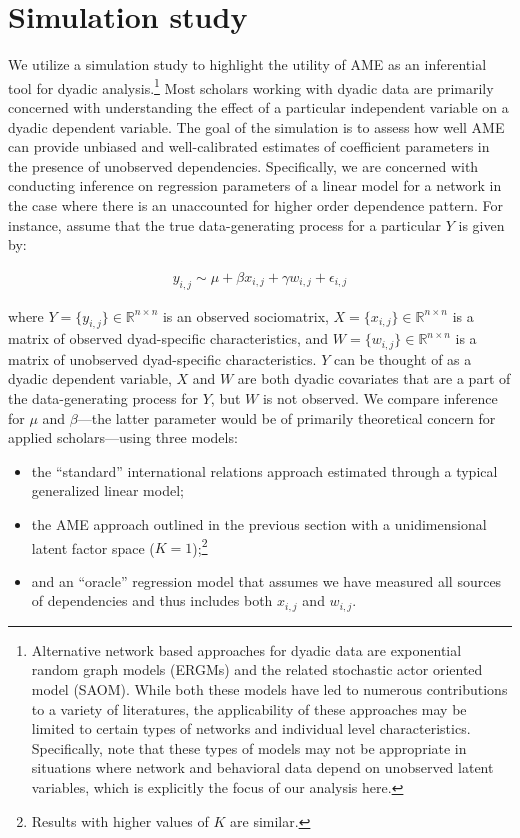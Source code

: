 \section{\textbf{Simulation study}}

We utilize a simulation study to highlight the utility of AME as an inferential tool for dyadic analysis.\footnote{Alternative network based approaches for dyadic data are exponential random graph models (ERGMs) and the related stochastic actor oriented model (SAOM). While both these models have led to numerous contributions to a variety of literatures, the applicability of these approaches may be limited to certain types of networks and individual level characteristics. Specifically, \citet{block:etal:2017} note that these types of  models may not be appropriate in situations where network and behavioral data depend on unobserved latent variables, which is explicitly the focus of our analysis here.} Most scholars working with dyadic data are primarily concerned with understanding the effect of a particular independent variable on a dyadic dependent variable. The goal of the simulation is to assess how well AME can provide unbiased and well-calibrated estimates of coefficient parameters in the presence of unobserved dependencies. Specifically, we are concerned with conducting inference on regression parameters of a linear model for a network in the case where there is an unaccounted for higher order dependence pattern. For instance, assume that the true data-generating process for a particular $Y$ is given by:

\begin{align}
	y_{i,j} \sim  \mu + \beta x_{i,j} + \gamma w_{i,j} + \epsilon_{i,j}
	\label{eqn:sim}
\end{align}

where $Y= \{y_{i,j}\}\in \mathbb R^{n\times n}$ is an observed sociomatrix, $X = \{x_{i,j} \} \in \mathbb R^{n \times n}$ is a matrix of observed dyad-specific characteristics, and $W = \{ w_{i,j}\} \in \mathbb R^{n \times n}$ is a matrix of unobserved dyad-specific characteristics. $Y$ can be thought of as a dyadic dependent variable, $X$ and $W$ are both dyadic covariates that are a part of the data-generating process for $Y$, but $W$ is not observed. We compare inference for $\mu$ and $\beta$---the latter parameter would be of primarily theoretical concern for applied scholars---using three models:

\begin{itemize}
	\item the ``standard'' international relations approach estimated through a typical generalized linear model; 
	\item the AME approach outlined in the previous section with a unidimensional latent factor space ($K=1$);\footnote{Results with higher values of $K$ are similar.}
	\item and an ``oracle'' regression model that assumes we have measured all sources of dependencies and thus includes both $x_{i,j}$ and $w_{i,j}$. 
\end{itemize}

